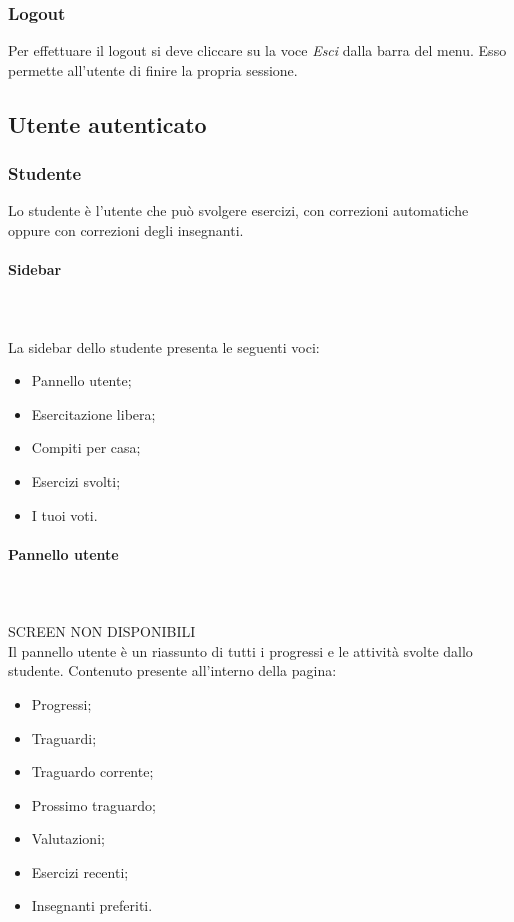     \subsubsection{Logout}
    Per effettuare il {logout} si deve cliccare su la voce \textit{Esci} dalla barra del menu. Esso permette all'utente  di finire la propria sessione.
    \newpage

\subsection{Utente autenticato}

    \subsubsection{Studente}
    Lo studente è l'utente che può svolgere esercizi, con correzioni
    automatiche oppure con correzioni degli insegnanti.
        \paragraph{Sidebar} \mbox{}\\ \\
            La sidebar dello studente presenta le seguenti voci:
            \begin{itemize}
                \item Pannello utente;
                \item Esercitazione libera;
                \item Compiti per casa;
                \item Esercizi svolti;
                \item I tuoi voti.
            \end{itemize}
        \paragraph{Pannello utente}\mbox{}\\ \\
        SCREEN NON DISPONIBILI
        \\Il pannello utente è un riassunto di tutti i progressi e le attività svolte dallo studente.
        Contenuto presente all'interno della pagina:
        \begin{itemize}
        \item Progressi;
        \item Traguardi;
        \item Traguardo corrente;
        \item Prossimo traguardo;
        \item Valutazioni;
        \item Esercizi recenti;
        \item Insegnanti preferiti.
        \end{itemize}
